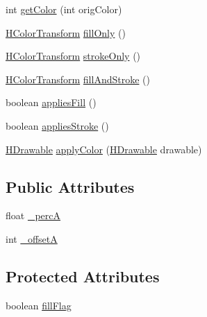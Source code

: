 \begin{DoxyCompactItemize}
\item 
int \hyperlink{classhype_1_1colorist_1_1_h_color_transform_a2dc07ab67ba6812c920be35802007834}{get\-Color} (int orig\-Color)
\item 
\hyperlink{classhype_1_1colorist_1_1_h_color_transform}{H\-Color\-Transform} \hyperlink{classhype_1_1colorist_1_1_h_color_transform_aa20641cfd61a07955b8f2f378e266dc7}{fill\-Only} ()
\item 
\hyperlink{classhype_1_1colorist_1_1_h_color_transform}{H\-Color\-Transform} \hyperlink{classhype_1_1colorist_1_1_h_color_transform_a11a6293c6f446a732c214a7f6aaf2679}{stroke\-Only} ()
\item 
\hyperlink{classhype_1_1colorist_1_1_h_color_transform}{H\-Color\-Transform} \hyperlink{classhype_1_1colorist_1_1_h_color_transform_a6c6f00f90e02066f9d5ce96a0fd74122}{fill\-And\-Stroke} ()
\item 
boolean \hyperlink{classhype_1_1colorist_1_1_h_color_transform_ac3bc7246d900c834038ecf843726bf02}{applies\-Fill} ()
\item 
boolean \hyperlink{classhype_1_1colorist_1_1_h_color_transform_afa3b15b8c9f6593bdc2aac3f34a93188}{applies\-Stroke} ()
\item 
\hyperlink{classhype_1_1drawable_1_1_h_drawable}{H\-Drawable} \hyperlink{classhype_1_1colorist_1_1_h_color_transform_a7cd7169e04fa955ac51a338568a7f164}{apply\-Color} (\hyperlink{classhype_1_1drawable_1_1_h_drawable}{H\-Drawable} drawable)
\end{DoxyCompactItemize}
\subsection*{Public Attributes}
\begin{DoxyCompactItemize}
\item 
float \hyperlink{classhype_1_1colorist_1_1_h_color_transform_aff98c3552490d02a099258f393a99781}{\-\_\-perc\-A}
\item 
int \hyperlink{classhype_1_1colorist_1_1_h_color_transform_aee4e808255a2c3e3d10980da4c2cc71e}{\-\_\-offset\-A}
\end{DoxyCompactItemize}
\subsection*{Protected Attributes}
\begin{DoxyCompactItemize}
\item 
boolean \hyperlink{classhype_1_1colorist_1_1_h_color_transform_ae87ee3a68c382df64151c56f8eeca2d4}{fill\-Flag}
\end{DoxyCompactItemize}


